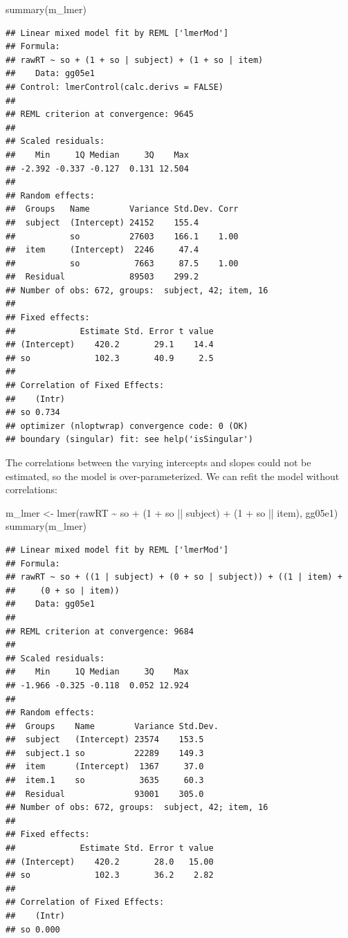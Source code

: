 \documentclass[
  12pt,
]{krantz}
\newenvironment{Shaded}{\begin{snugshade}}{\end{snugshade}}
\newcommand{\DecValTok}[1]{\textcolor[rgb]{0.00,0.00,0.81}{#1}}
\newcommand{\FunctionTok}[1]{\textcolor[rgb]{0.00,0.00,0.00}{#1}}
\newcommand{\NormalTok}[1]{#1}
\newcommand{\OtherTok}[1]{\textcolor[rgb]{0.56,0.35,0.01}{#1}}
\newcommand{\SpecialCharTok}[1]{\textcolor[rgb]{0.00,0.00,0.00}{#1}}
\theoremstyle{definition}
\theoremstyle{definition}
\theoremstyle{definition}
\theoremstyle{definition}
\theoremstyle{remark}
\begin{document}
\begin{Shaded}
\begin{Highlighting}[]
\FunctionTok{summary}\NormalTok{(m\_lmer)}
\end{Highlighting}
\end{Shaded}

\begin{verbatim}
## Linear mixed model fit by REML ['lmerMod']
## Formula: 
## rawRT ~ so + (1 + so | subject) + (1 + so | item)
##    Data: gg05e1
## Control: lmerControl(calc.derivs = FALSE)
## 
## REML criterion at convergence: 9645
## 
## Scaled residuals: 
##    Min     1Q Median     3Q    Max 
## -2.392 -0.337 -0.127  0.131 12.504 
## 
## Random effects:
##  Groups   Name        Variance Std.Dev. Corr
##  subject  (Intercept) 24152    155.4        
##           so          27603    166.1    1.00
##  item     (Intercept)  2246     47.4        
##           so           7663     87.5    1.00
##  Residual             89503    299.2        
## Number of obs: 672, groups:  subject, 42; item, 16
## 
## Fixed effects:
##             Estimate Std. Error t value
## (Intercept)    420.2       29.1    14.4
## so             102.3       40.9     2.5
## 
## Correlation of Fixed Effects:
##    (Intr)
## so 0.734 
## optimizer (nloptwrap) convergence code: 0 (OK)
## boundary (singular) fit: see help('isSingular')
\end{verbatim}

The correlations between the varying intercepts and slopes could not be estimated, so the model is over-parameterized. We can refit the model without correlations:

\begin{Shaded}
\begin{Highlighting}[]
\NormalTok{m\_lmer }\OtherTok{\textless{}{-}} \FunctionTok{lmer}\NormalTok{(rawRT }\SpecialCharTok{\textasciitilde{}}\NormalTok{ so }\SpecialCharTok{+}\NormalTok{ (}\DecValTok{1} \SpecialCharTok{+}\NormalTok{ so }\SpecialCharTok{||}\NormalTok{ subject) }\SpecialCharTok{+}\NormalTok{ (}\DecValTok{1} \SpecialCharTok{+}\NormalTok{ so }\SpecialCharTok{||}\NormalTok{ item), gg05e1)}
\FunctionTok{summary}\NormalTok{(m\_lmer)}
\end{Highlighting}
\end{Shaded}

\begin{verbatim}
## Linear mixed model fit by REML ['lmerMod']
## Formula: 
## rawRT ~ so + ((1 | subject) + (0 + so | subject)) + ((1 | item) +  
##     (0 + so | item))
##    Data: gg05e1
## 
## REML criterion at convergence: 9684
## 
## Scaled residuals: 
##    Min     1Q Median     3Q    Max 
## -1.966 -0.325 -0.118  0.052 12.924 
## 
## Random effects:
##  Groups    Name        Variance Std.Dev.
##  subject   (Intercept) 23574    153.5   
##  subject.1 so          22289    149.3   
##  item      (Intercept)  1367     37.0   
##  item.1    so           3635     60.3   
##  Residual              93001    305.0   
## Number of obs: 672, groups:  subject, 42; item, 16
## 
## Fixed effects:
##             Estimate Std. Error t value
## (Intercept)    420.2       28.0   15.00
## so             102.3       36.2    2.82
## 
## Correlation of Fixed Effects:
##    (Intr)
## so 0.000
\end{verbatim}
\end{document}
